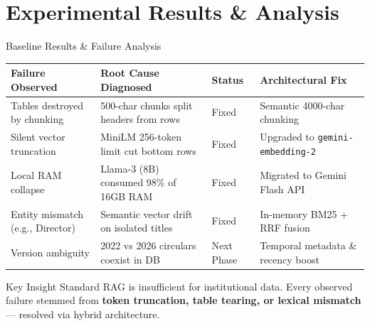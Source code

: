\documentclass[11pt]{beamer}
\begin{document}
\section{Experimental Results \& Analysis}
\begin{frame}{Baseline Results \& Failure Analysis}
    \begin{table}[h]
    \centering
    \scriptsize
    \begin{tabular}{@{}p{2.4cm}p{3.4cm}p{1.4cm}p{3.2cm}@{}}
        \toprule
        \textbf{Failure Observed} & \textbf{Root Cause Diagnosed} & \textbf{Status} & \textbf{Architectural Fix}\\
        \midrule
        Tables destroyed by chunking & 500-char chunks split headers from rows & Fixed & Semantic 4000-char chunking\\[3pt]
        Silent vector truncation & MiniLM 256-token limit cut bottom rows & Fixed & Upgraded to \texttt{gemini-embedding-2}\\[3pt]
        Local RAM collapse & Llama-3 (8B) consumed 98\% of 16GB RAM & Fixed & Migrated to Gemini Flash API\\[3pt]
        Entity mismatch (e.g., Director) & Semantic vector drift on isolated titles & Fixed & In-memory BM25 + RRF fusion\\[3pt]
        Version ambiguity & 2022 vs 2026 circulars coexist in DB & Next Phase & Temporal metadata \& recency boost\\
        \bottomrule
    \end{tabular}
    \end{table}
    \vspace{2pt}
    \begin{alertblock}{Key Insight}
        Standard RAG is insufficient for institutional data. Every observed failure stemmed from \textbf{token truncation, table tearing, or lexical mismatch} --- resolved via hybrid architecture.
    \end{alertblock}
\end{frame}
\end{document}
